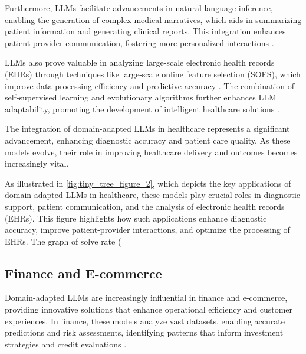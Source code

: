 Furthermore, LLMs facilitate advancements in natural language inference, enabling the generation of complex medical narratives, which aids in summarizing patient information and generating clinical reports. This integration enhances patient-provider communication, fostering more personalized interactions \cite{gao2023benefitslabeldescriptiontrainingzeroshot}. 

LLMs also prove valuable in analyzing large-scale electronic health records (EHRs) through techniques like large-scale online feature selection (SOFS), which improve data processing efficiency and predictive accuracy \cite{wu2015largescaleonlinefeatureselection}. The combination of self-supervised learning and evolutionary algorithms further enhances LLM adaptability, promoting the development of intelligent healthcare solutions \cite{le2019evolvingselfsupervisedneuralnetworks}. 

The integration of domain-adapted LLMs in healthcare represents a significant advancement, enhancing diagnostic accuracy and patient care quality. As these models evolve, their role in improving healthcare delivery and outcomes becomes increasingly vital.

As illustrated in \autoref{fig:tiny_tree_figure_2}, which depicts the key applications of domain-adapted LLMs in healthcare, these models play crucial roles in diagnostic support, patient communication, and the analysis of electronic health records (EHRs). This figure highlights how such applications enhance diagnostic accuracy, improve patient-provider interactions, and optimize the processing of EHRs. The graph of solve rate (%


\subsection{Finance and E-commerce} \label{subsec:Finance and E-commerce}

Domain-adapted LLMs are increasingly influential in finance and e-commerce, providing innovative solutions that enhance operational efficiency and customer experiences. In finance, these models analyze vast datasets, enabling accurate predictions and risk assessments, identifying patterns that inform investment strategies and credit evaluations \cite{li2023ecomgptinstructiontuninglargelanguage}.

